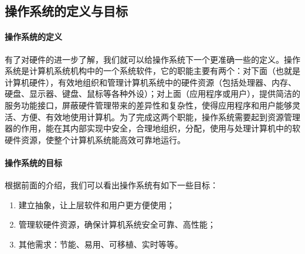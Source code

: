 \subsection{操作系统的定义与目标}


\paragraph{操作系统的定义}

有了对硬件的进一步了解，我们就可以给操作系统下一个更准确一些的定义。操作系统是计算机系统机构中的一个系统软件，它的职能主要有两个：对下面（也就是计算机硬件），有效地组织和管理计算机系统中的硬件资源（包括处理器、内存、硬盘、显示器、键盘、鼠标等各种外设）；对上面（应用程序或用户），提供简洁的服务功能接口，屏蔽硬件管理带来的差异性和复杂性，使得应用程序和用户能够灵活、方便、有效地使用计算机。为了完成这两个职能，操作系统需要起到资源管理器的作用，能在其内部实现中安全，合理地组织，分配，使用与处理计算机中的软硬件资源，使整个计算机系统能高效可靠地运行。

\paragraph{操作系统的目标}

根据前面的介绍，我们可以看出操作系统有如下一些目标：

\begin{enumerate}
	\item 建立抽象，让上层软件和用户更方便使用；
	\item 管理软硬件资源，确保计算机系统安全可靠、高性能；
	\item 其他需求：节能、易用、可移植、实时等等。
\end{enumerate}

